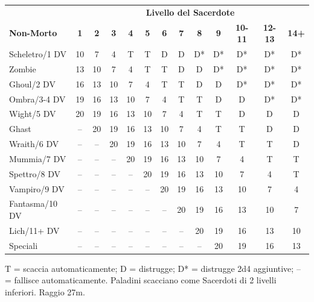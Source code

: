 \documentclass[10pt,a4paper,landscape]{article}
\begin{document}
	\scriptsize
	\noindent
	\begin{tabular}{lcccccccccccc}
		\toprule
		\rowcolor{lightgray}
		& \multicolumn{12}{c}{\textbf{Livello del Sacerdote}} \\
		\rowcolor{lightgray}
		\textbf{Non-Morto} & \textbf{1} & \textbf{2} & \textbf{3} & \textbf{4} & \textbf{5} & \textbf{6} & \textbf{7} & \textbf{8} & \textbf{9} & \textbf{10-11} & \textbf{12-13} & \textbf{14+} \\
		\midrule
		Scheletro/1 DV & 10 & 7 & 4 & T & T & D & D & D* & D* & D* & D* & D* \\
		\rowcolor{lightgray}
		Zombie & 13 & 10 & 7 & 4 & T & T & D & D & D* & D* & D* & D* \\
		Ghoul/2 DV & 16 & 13 & 10 & 7 & 4 & T & T & D & D & D* & D* & D* \\
		\rowcolor{lightgray}
		Ombra/3-4 DV & 19 & 16 & 13 & 10 & 7 & 4 & T & T & D & D & D* & D* \\
		Wight/5 DV & 20 & 19 & 16 & 13 & 10 & 7 & 4 & T & T & D & D & D \\
		\rowcolor{lightgray}
		Ghast & -- & 20 & 19 & 16 & 13 & 10 & 7 & 4 & T & T & D & D \\
		Wraith/6 DV & -- & -- & 20 & 19 & 16 & 13 & 10 & 7 & 4 & T & T & D \\
		\rowcolor{lightgray}
		Mummia/7 DV & -- & -- & -- & 20 & 19 & 16 & 13 & 10 & 7 & 4 & T & T \\
		Spettro/8 DV & -- & -- & -- & -- & 20 & 19 & 16 & 13 & 10 & 7 & 4 & T \\
		\rowcolor{lightgray}
		Vampiro/9 DV & -- & -- & -- & -- & -- & 20 & 19 & 16 & 13 & 10 & 7 & 4 \\
		Fantasma/10 DV & -- & -- & -- & -- & -- & -- & 20 & 19 & 16 & 13 & 10 & 7 \\
		\rowcolor{lightgray}
		Lich/11+ DV & -- & -- & -- & -- & -- & -- & -- & 20 & 19 & 16 & 13 & 10 \\
		Speciali & -- & -- & -- & -- & -- & -- & -- & -- & 20 & 19 & 16 & 13 \\
		\bottomrule
	\end{tabular}
	\par
	{\scriptsize T = scaccia automaticamente; D = distrugge; D* = distrugge 2d4 aggiuntive; -- = fallisce automaticamente. Paladini scacciano come Sacerdoti di 2 livelli inferiori. Raggio 27m.}

	\vspace{4pt}
\end{document}
